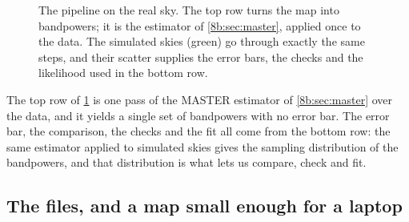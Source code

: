 \begin{figure}[htbp]
\centering
{}
\caption{The pipeline on the real sky. The top row turns the map into bandpowers; it is the estimator of
\cref{8b:sec:master}, applied once to the data. The simulated skies (green) go through exactly the same
steps, and their scatter supplies the error bars, the checks and the likelihood used in the bottom row.}
\label{13a:fig:pipeline}
\end{figure}

The top row of \cref{13a:fig:pipeline} is one pass of the MASTER estimator of \cref{8b:sec:master} over the
data, and it yields a single set of bandpowers with no error bar. The error bar, the comparison, the checks and the fit
all come from the bottom row: the same estimator applied to simulated skies gives the sampling distribution of the
bandpowers, and that distribution is what lets us compare, check and fit.

\subsection{The files, and a map small enough for a laptop}
\label{13a:sec:files}

